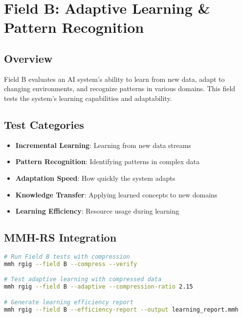 \documentclass[12pt,a4paper]{article}
\begin{document}
\newpage

\section{Field B: Adaptive Learning \& Pattern Recognition}

\subsection{Overview}
Field B evaluates an AI system's ability to learn from new data, adapt to changing environments, and recognize patterns in various domains. This field tests the system's learning capabilities and adaptability.

\subsection{Test Categories}
\begin{itemize}
    \item \textbf{Incremental Learning}: Learning from new data streams
    \item \textbf{Pattern Recognition}: Identifying patterns in complex data
    \item \textbf{Adaptation Speed}: How quickly the system adapts
    \item \textbf{Knowledge Transfer}: Applying learned concepts to new domains
    \item \textbf{Learning Efficiency}: Resource usage during learning
\end{itemize}

\subsection{MMH-RS Integration}
\begin{lstlisting}[language=bash, caption=Field B Testing with MMH-RS]
# Run Field B tests with compression
mmh rgig --field B --compress --verify

# Test adaptive learning with compressed data
mmh rgig --field B --adaptive --compression-ratio 2.15

# Generate learning efficiency report
mmh rgig --field B --efficiency-report --output learning_report.mmh
\end{lstlisting}
\end{document}
